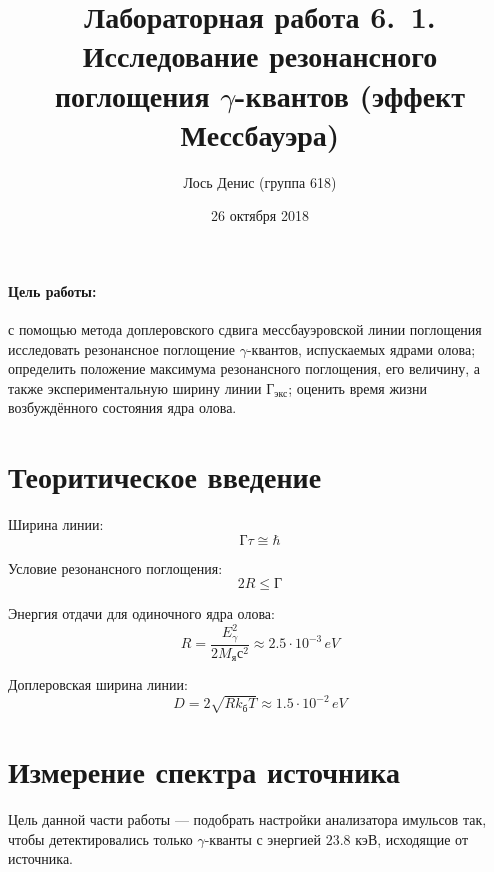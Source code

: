 \documentclass[12pt]{article}
\title{{\bf Лабораторная работа 6.\, 1. \\ Исследование резонансного поглощения $\gamma$-квантов (эффект Мессбауэра)}}
\author{Лось Денис (группа 618)}
\date{26 октября 2018}
\begin{document}
\maketitle

\paragraph*{Цель работы: } с помощью метода доплеровского сдвига мессбауэровской линии поглощения исследовать резонансное поглощение $\gamma$-квантов, испускаемых ядрами олова; определить положение максимума резонансного поглощения, его величину, а также экспериментальную ширину линии $\text{Г}_\text{экс}$; оценить время жизни возбуждённого состояния ядра олова.

\section*{Теоритическое введение}
\par
	Ширина линии:
\begin{equation}
	\text{Г}\tau \cong \hbar 	
\end{equation}
\par
	Условие резонансного поглощения:
\begin{equation}
	2R \leq \text{Г}
\end{equation}
\par
	Энергия отдачи для одиночного ядра олова:
\begin{equation}
	R = \frac{E_\gamma^2}{2 M_\text{я} с^2} \approx 2.5 \cdot 10^{-3} \, eV
\end{equation}
\par
	Доплеровская ширина линии:
\begin{equation}
	D = 2 \sqrt{R k_\text{б} T} \approx 1.5 \cdot 10^{-2} \,  eV
\end{equation}

\section*{Измерение спектра источника}
\par
	Цель данной части работы --- подобрать настройки анализатора имульсов так, чтобы детектировались только $\gamma$-кванты с энергией $23.8$ кэВ, исходящие от источника.
\end{document}
